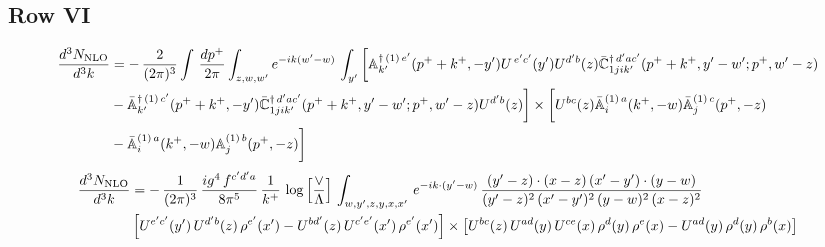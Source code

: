 \documentclass[9pt]{article}
\def\mf#1{\mathbb{#1}}
\numberwithin{equation}{section}
\begin{document}
\subsection{{\color{green}Row VI}}
\begin{align}
     \frac{d^{3}N_{\rm NLO}}{d^{3}k} & =   -\,\frac{2}{(2\pi)^{3}} \int\, \frac{dp^{+}}{2\pi}\int_{z,w,w^{\prime}} e^{-ik(w^{\prime}-w)}\, \int_{y^{\prime}}\bigg[\mf{A}^{\dagger\, (1)\,e^{\prime}}_{k^{\prime}}(p^{+}+k^{+},-y^{\prime})U^{\, e^{\prime}c^{\prime}}(y^{\prime})U^{d^{\prime}b}(z) \Bar{\mf{C}}^{\dagger\, d^{\prime}ac^{\prime}}_{1jik^{\prime}}(p^{+}+k^{+},y^{\prime}-w^{\prime}; p^{+},w^{\prime}-z) \notag \\ & -\Bar{\mf{A}}^{\dagger\, (1)\,c^{\prime}}_{k^{\prime}}(p^{+}+k^{+},-y^{\prime})\Bar{\mf{C}}^{\dagger\, d^{\prime}ac^{\prime}}_{1jik^{\prime}}(p^{+}+k^{+},y^{\prime}-w^{\prime}; p^{+},w^{\prime}-z)U^{d^{\prime}b}(z)\bigg] \times \bigg[U^{bc}(z)\Bar{\mf{A}}^{(1)\, a}_{i}(k^{+},- w)\Bar{\mf{A}}^{(1)\, c}_{j}(p^{+},-z)\notag \\ & -\Bar{\mf{A}}^{(1)\, a}_{i}(k^{+},- w) \mf{A}^{(1)\, b}_{j}(p^{+},- z)\bigg]\nonumber
\end{align}
\begin{align}
    \frac{d^{3}N_{\rm NLO}}{d^{3}k} & = -\,\frac{1}{(2\pi)^{3}}\, \frac{ig^{4}\,f^{c'd'a}}{8\pi^{5}}\, \frac{1}{k^{+}}\,\log{\left[\frac{\vee}{\Lambda}\right]}\, \int_{w,y',z,y,x,x'}\, e^{-ik\cdot (y'-w)}\,\frac{(y'-z)\cdot (x-z)\,(x'-y')\cdot (y-w)}{(y'-z)^{2}\,(x'-y')^{2}\,(y-w)^{2}\,(x-z)^{2}}\notag \\ & \left[U^{e'c'}(y')\,U^{d'b}(z)\,\rho^{e'}(x')-U^{bd'}(z)\,U^{c'e'}(x')\,\rho^{e'}(x')\right]\times  \left[U^{bc}(z)\,U^{ad}(y)\,U^{ce}(x)\,\rho^{d}(y)\,\rho^{e}(x)-U^{ad}(y)\,\rho^{d}(y)\,\rho^{b}(x)\right]
\end{align}
\end{document}
